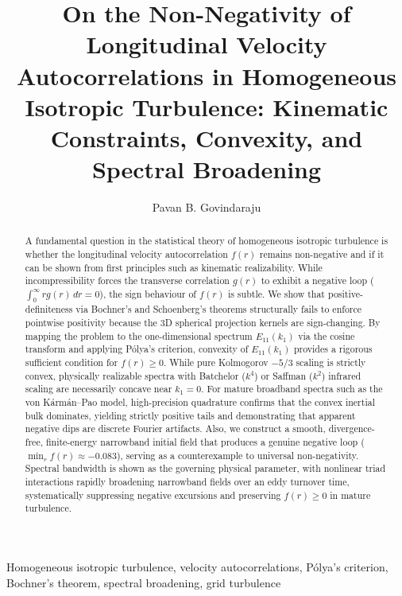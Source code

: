 \documentclass[lineno]{jfm}
\title{On the Non-Negativity of Longitudinal Velocity Autocorrelations in Homogeneous Isotropic Turbulence: Kinematic Constraints, Convexity, and Spectral Broadening}
\author{
  Pavan B. Govindaraju\aff{1}\corresp{\email{pavan@splitfxm.com}}
}
\affiliation{
  \aff{1}SplitFXM, Hyderabad, India
}
\begin{document}
\maketitle

\begin{abstract}
A fundamental question in the statistical theory of homogeneous isotropic turbulence is whether the longitudinal velocity autocorrelation $f(r)$ remains non-negative and if it can be shown from first principles such as kinematic realizability. While incompressibility forces the transverse correlation $g(r)$ to exhibit a negative loop ($\int_0^\infty r g(r)\,dr = 0$), the sign behaviour of $f(r)$ is subtle. We show that positive-definiteness via Bochner's and Schoenberg's theorems structurally fails to enforce pointwise positivity because the 3D spherical projection kernels are sign-changing. By mapping the problem to the one-dimensional spectrum $E_{11}(k_1)$ via the cosine transform and applying P\'olya's criterion, convexity of $E_{11}(k_1)$ provides a rigorous sufficient condition for $f(r) \ge 0$. While pure Kolmogorov $-5/3$ scaling is strictly convex, physically realizable spectra with Batchelor ($k^4$) or Saffman ($k^2$) infrared scaling are necessarily concave near $k_1 = 0$. For mature broadband spectra such as the von K\'arm\'an--Pao model, high-precision quadrature confirms that the convex inertial bulk dominates, yielding strictly positive tails and demonstrating that apparent negative dips are discrete Fourier artifacts. Also, we construct a smooth, divergence-free, finite-energy narrowband initial field that produces a genuine negative loop ($\min_r f(r) \approx -0.083$), serving as a counterexample to universal non-negativity. Spectral bandwidth is shown as the governing physical parameter, with nonlinear triad interactions rapidly broadening narrowband fields over an eddy turnover time, systematically suppressing negative excursions and preserving $f(r) \ge 0$ in mature turbulence.
\end{abstract}

\begin{keywords}
Homogeneous isotropic turbulence, velocity autocorrelations, P\'olya's criterion, Bochner's theorem, spectral broadening, grid turbulence
\end{keywords}
\end{document}
